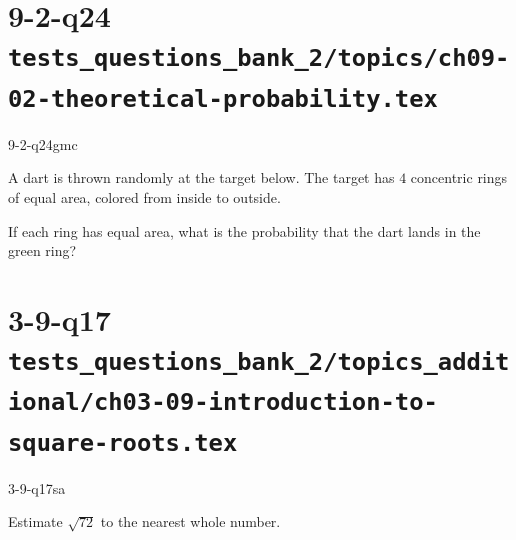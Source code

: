 \documentclass[12pt, fleqn, openany]{studyGuide}
\begin{document}
\section*{9-2-q24 \hfill \normalsize\texttt{tests\_questions\_bank\_2/topics/ch09-02-theoretical-probability.tex}}
\begin{practiceQuestion}{9-2-q24}{gmc}
\begin{questionText}
A dart is thrown randomly at the target below. The target has $4$ concentric rings of equal area, colored from inside to outside.

\begin{center}
\end{center}

If each ring has equal area, what is the probability that the dart lands in the green ring?
\end{questionText}
\end{practiceQuestion}

\newpage
\section*{3-9-q17 \hfill \normalsize\texttt{tests\_questions\_bank\_2/topics\_additional/ch03-09-introduction-to-square-roots.tex}}
\begin{practiceQuestion}{3-9-q17}{sa}
\begin{questionText}
Estimate $\sqrt{72}$ to the nearest whole number.
\end{questionText}
\end{practiceQuestion}

\newpage
\end{document}

